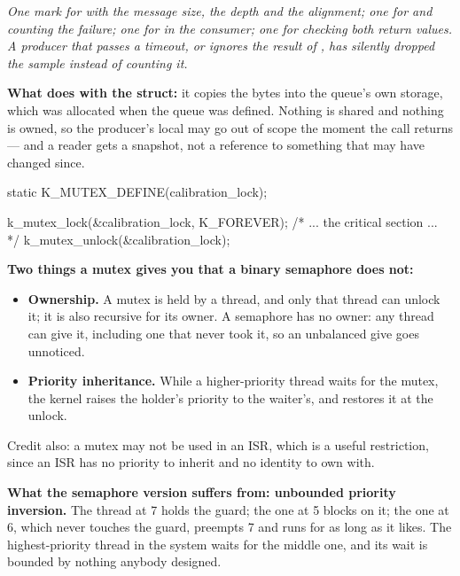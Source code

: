 \noindent{}

\noindent\emph{One mark for  with the message size, the depth and the alignment;
one for  and counting the failure; one for  in the consumer; one for
checking both return values. A producer that passes a timeout, or ignores the result of
, has silently dropped the sample instead of counting it.}

\textbf{What  does with the struct:} it copies the bytes into the queue's own
storage, which was allocated when the queue was defined. Nothing is shared and nothing is owned, so
the producer's local may go out of scope the moment the call returns --- and a reader gets a
snapshot, not a reference to something that may have changed since. 


\begin{ccode}
static K_MUTEX_DEFINE(calibration_lock);

	k_mutex_lock(&calibration_lock, K_FOREVER);
	/* ... the critical section ... */
	k_mutex_unlock(&calibration_lock);
\end{ccode}

\noindent{}

\textbf{Two things a mutex gives you that a binary semaphore does not:}
\begin{itemize}
  \item \textbf{Ownership.} A mutex is held by a thread, and only that thread can unlock it; it is
    also recursive for its owner. A semaphore has no owner: any thread can give it, including one
    that never took it, so an unbalanced give goes unnoticed.
  \item \textbf{Priority inheritance.} While a higher-priority thread waits for the mutex, the
    kernel raises the holder's priority to the waiter's, and restores it at the unlock.
\end{itemize}

\noindent Credit also: a mutex may not be used in an ISR, which is a useful restriction, since an
ISR has no priority to inherit and no identity to own with. 

\textbf{What the semaphore version suffers from: unbounded priority inversion.} The thread at 7
holds the guard; the one at 5 blocks on it; the one at 6, which never touches the guard, preempts 7
and runs for as long as it likes. The highest-priority thread in the system waits for the middle
one, and its wait is bounded by nothing anybody designed.

